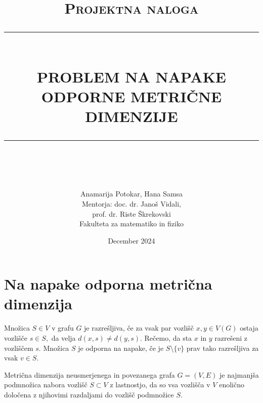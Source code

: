 \documentclass[12pt]{article}
\newcommand{\HRule}[1]{\rule{\linewidth}{#1}}
\begin{document}
\title{ \normalsize \textsc{Projektna naloga}
		\\ [2.0cm]
		\HRule{0.5pt} \\
		\LARGE \textbf{\uppercase{Problem na napake odporne metrične dimenzije}}
		\HRule{2pt} \\ [0.5cm]
		\normalsize \date{December 2024} \vspace*{5\baselineskip}}
\author{
		Anamarija Potokar, Hana Samsa 
        \vspace{1 cm} \\
		Mentorja: doc. dr. Janoš Vidali, \\
        prof. dr. Riste Škrekovski 
        \vspace{1 cm} \\
		Fakulteta za matematiko in fiziko }

\maketitle

\newpage

\section{Na napake odporna metrična dimenzija}

Množica $S \in V$ v grafu $G$ je razrešljiva, če za vsak par vozlišč $x, y \in V(G)$ 
ostaja vozlišče $s \in S,$ da velja $d(x, s) \neq d(y, s).$ Rečemo, da sta $x$ in $y$
razrešeni z vozliščem $s$. Množica $S$ je odporna na napake, če je 
$S \setminus \{v\}$ prav tako razrešljiva za vsak $v \in S.$ 

Metrična dimenzija neusmerjenega in povezanega grafa $G = (V, E)$ je najmanjša 
podmnožica nabora vozlišč $S \subset V$ z lastnostjo, da so vsa vozlišča v $V$ 
enolično določena z njihovimi razdaljami do vozlišč podmnožice $S$.

\end{document}
